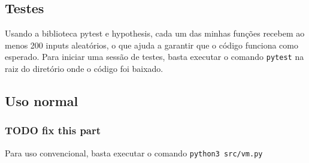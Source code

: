 \documentclass[11pt]{article}
\begin{document}
\subsection{Testes}
\label{sec:org7aa3bbd}
Usando a biblioteca pytest e hypothesis, cada um das minhas funções recebem ao
menos 200 inputs aleatórios, o que ajuda a garantir que o código funciona como
esperado. Para iniciar uma sessão de testes, basta executar o comando \texttt{pytest} na raiz do diretório onde o código foi baixado.
\subsection{Uso normal}
\label{sec:org14f6057}
\subsubsection{{\bfseries\sffamily TODO} fix this part}
\label{sec:orgad55777}
Para uso convencional, basta executar o comando
\texttt{python3 src/vm.py}
\end{document}
